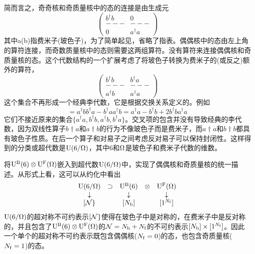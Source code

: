 简而言之，奇奇核和奇质量核中的态的连接是由生成元
\begin{equation*}
	\left(\begin{array}{c|c}
	b^\dagger b&0\\
	---&---\\
	0&a^\dagger a
	\end{array}\right)
\end{equation*}
其中a(b)指费米子(玻色子)，为了简单起见，省略了指表。偶偶核中的态由左上角的算符连接，而奇数质量核中的态则需要这两组算符。没有算符来连接偶偶核和奇质量核的态。这个代数结构的一个扩展考虑了将玻色子转换为费米子的(或反之)额外的算符，
\begin{equation*}
\left(\begin{array}
{c|c}
b^\dagger b&b^\dagger a\\
---&---\\
a^\dagger b&a^\dagger a
\end{array}
\right)
\end{equation*}
这个集合不再形成一个经典李代数，它是根据交换关系定义的。例如
\begin{equation*}
[a^\dagger b,b^\dagger a]=
a^\dagger bb^\dagger a-b^\dagger aa^\dagger b=
a^\dagger a-b^\dagger b+2b^\dagger ba^\dagger a
\end{equation*}
它们不接近原来的集合$\{a^\dagger a,b^\dagger b,a^\dagger b,b^\dagger a\}$。交叉项的包含并没有导致经典的李代数，因为双线性算子$b\dag a$和$a\dag b$的行为不像玻色子而是费米子，而$a\dag a$和$b\dag b$都具有玻色子性质。在后一个算子和对易子之间考虑反对易子可以保持封闭性。这样得到的分类或超代数是${\rm U(6/\Omega)}$，其中6和${\rm \Omega}$是玻色子和费米子代数的维数。

将${\rm U}^{\rm B}(6)\otimes{\rm U}^{\rm F}(\Omega)$嵌入到超代数${\rm U}(6/\Omega)$中，实现了偶偶核和奇质量核的统一描述。从形式上看，这可以从约化中看出
\begin{equation*}
\begin{array}{ccccc}
{\rm U}(6/\Omega)&\supset&
{\rm U}^{\rm B}(6)&\otimes&{\rm U}^{\rm F}(\Omega)\\
\downarrow&&\downarrow&&\downarrow\\[0mm]
[{\cal N}\}&&[N_{\rm b}]&&[1^{N_{\rm f}}]
\end{array}
\end{equation*}
${\rm U(6/\Omega)}$的超对称不可约表示$[{\cal N}\}$使得在玻色子中是对称的，在费米子中是反对称的，并且包含了${\rm U^B(6)\otimes U^F(\Omega)}$的${\cal N}=N_{\rm b}+N_{\rm f}$的不可约表示$[N_{\rm b}]\times[1^{N_{\rm f}}]$。因此一个单个的超对称不可约表示既包含偶偶核($N_{\rm f}=0$)的态，也包含奇质量核($N_{\rm f}=1$)的态。

